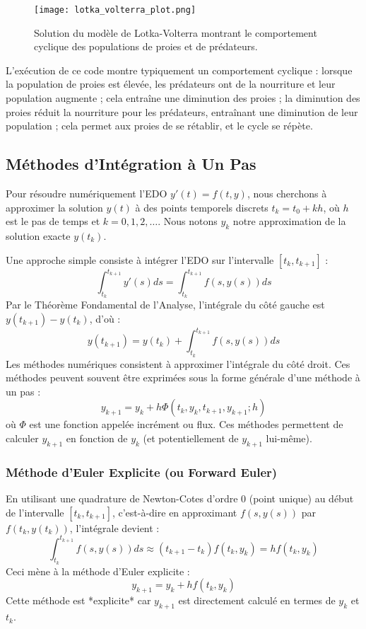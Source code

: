 \documentclass{article}
\begin{document}
\begin{figure}[H]
\centering
\texttt{[image: lotka\_volterra\_plot.png]}
\caption{Solution du modèle de Lotka-Volterra montrant le comportement cyclique des populations de proies et de prédateurs.}
\label{fig:lotka_volterra_plot}
\end{figure}

L'exécution de ce code montre typiquement un comportement cyclique : lorsque la population de proies est élevée, les prédateurs ont de la nourriture et leur population augmente ; cela entraîne une diminution des proies ; la diminution des proies réduit la nourriture pour les prédateurs, entraînant une diminution de leur population ; cela permet aux proies de se rétablir, et le cycle se répète.

\subsection*{Méthodes d'Intégration à Un Pas}

Pour résoudre numériquement l'EDO $y'(t) = f(t, y)$, nous cherchons à approximer la solution $y(t)$ à des points temporels discrets $t_k = t_0 + k h$, où $h$ est le pas de temps et $k = 0, 1, 2, \dots$. Nous notons $y_k$ notre approximation de la solution exacte $y(t_k)$.

Une approche simple consiste à intégrer l'EDO sur l'intervalle $[t_k, t_{k+1}]$ :
\[ \int_{t_k}^{t_{k+1}} y'(s) ds = \int_{t_k}^{t_{k+1}} f(s, y(s)) ds \]
Par le Théorème Fondamental de l'Analyse, l'intégrale du côté gauche est $y(t_{k+1}) - y(t_k)$, d'où :
\[ y(t_{k+1}) = y(t_k) + \int_{t_k}^{t_{k+1}} f(s, y(s)) ds \]
Les méthodes numériques consistent à approximer l'intégrale du côté droit. Ces méthodes peuvent souvent être exprimées sous la forme générale d'une méthode à un pas :
\[ y_{k+1} = y_k + h \Phi(t_k, y_k, t_{k+1}, y_{k+1}; h) \]
où $\Phi$ est une fonction appelée incrément ou flux. Ces méthodes permettent de calculer $y_{k+1}$ en fonction de $y_k$ (et potentiellement de $y_{k+1}$ lui-même).

\subsubsection*{Méthode d'Euler Explicite (ou Forward Euler)}

En utilisant une quadrature de Newton-Cotes d'ordre 0 (point unique) au début de l'intervalle $[t_k, t_{k+1}]$, c'est-à-dire en approximant $f(s, y(s))$ par $f(t_k, y(t_k))$, l'intégrale devient :
\[ \int_{t_k}^{t_{k+1}} f(s, y(s)) ds \approx (t_{k+1} - t_k) f(t_k, y_k) = h f(t_k, y_k) \]
Ceci mène à la méthode d'Euler explicite :
\[ y_{k+1} = y_k + h f(t_k, y_k) \]
Cette méthode est *explicite* car $y_{k+1}$ est directement calculé en termes de $y_k$ et $t_k$.
\end{document}
